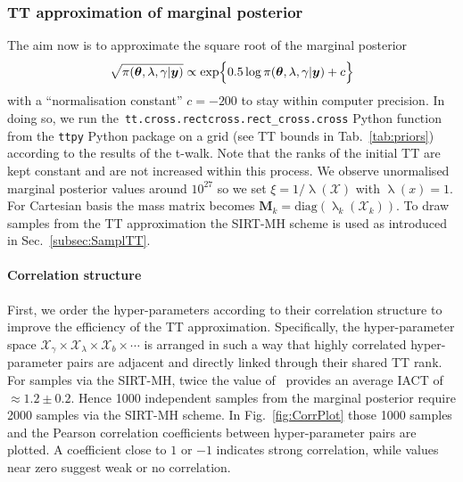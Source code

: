 \subsubsection{TT approximation of marginal posterior}
The aim now is to approximate the square root of the marginal posterior
\begin{align}
	\begin{split}
		\sqrt{\pi( \bm{\theta},\lambda,\gamma  | \bm{y})} \propto  \exp\Bigl\{ 0.5\log{\pi( \bm{\theta},\lambda,\gamma  | \bm{y}) } + c \Bigr\}  
	\end{split} 
	\label{eq:MargPostFullTT}
\end{align}
with a ``normalisation constant'' $c=-200$ to stay within computer precision.
In doing so, we run the~\texttt{tt.cross.rectcross.rect\_cross.cross} Python function from the \texttt{ttpy} Python package \cite{Oseledets2018ttpy} on a grid (see TT bounds in Tab.~\ref{tab:priors}) according to the results of the t-walk.
Note that the ranks of the initial TT are kept constant and are not increased within this process.
We observe unormalised marginal posterior values around $10^{27}$ so we set $\xi = 1 / \uplambda (\mathcal{X})$ with $\uplambda(x) = 1$.
For Cartesian basis the mass matrix becomes $\bm{M}_k = \text{diag}(\uplambda_k(\mathcal{X}_k))$.
To draw samples from the TT approximation the SIRT-MH scheme is used as introduced in Sec.~\ref{subsec:SamplTT}.

\cleardoublepage
\paragraph{Correlation structure}
First, we order the hyper-parameters according to their correlation structure to improve the efficiency of the TT approximation. 
Specifically, the hyper-parameter space $\mathcal{X}_{\gamma} \times \mathcal{X}_{\lambda} \times \mathcal{X}_{b} \times \cdots$ is arranged in such a way that highly correlated hyper-parameter pairs are adjacent and directly linked through their shared TT rank.
For samples via the SIRT-MH, twice the value of~\cite{wolff2004monte, drikHesse} provides an average IACT of $\approx 1.2 \pm 0.2$.
Hence 1000 independent samples from the marginal posterior require 2000 samples via the SIRT-MH scheme.
In Fig.~\ref{fig:CorrPlot} those 1000 samples and the Pearson correlation coefficients between hyper-parameter pairs are plotted.
A coefficient close to $1$ or $-1$ indicates strong correlation, while values near zero suggest weak or no correlation.


